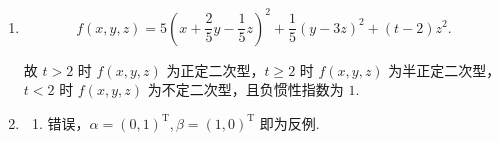 \begin{enumerate}
    设 \(C=\begin{pmatrix}
        C_1 & C_2\\
        C_3 & C_4
        \end{pmatrix},
        D=\begin{pmatrix}
        D_1 & D_2\\
        D_3 & D_4
        \end{pmatrix}\) ,其中 \(C\) 与 \(D\) 的分块均与 \(\begin{pmatrix}E_r & O\\O & O\end{pmatrix}\) 相同. 带入上述等式有 \(\begin{pmatrix}
            C_1 & O\\
            C_3 & O
            \end{pmatrix}=
            \begin{pmatrix}
            D_1 & D_2\\
            O & O
            \end{pmatrix}\)，由此知 \(C_1=D_1,C_3=O,D_2=O\)，故
        \(C=\begin{pmatrix}
        C_1 & C_2\\
        O & C_4
        \end{pmatrix},
        D=\begin{pmatrix}
        C_1 & O\\
        D_3 & D_4
        \end{pmatrix}\).

        由分块三角矩阵的性质知
        \begin{gather*}
            |\lambda E_n-C|=|\lambda E_r-C_1||\lambda E_{n-r}-C_4|,\\
            |\lambda E_n-D|=|\lambda E_r-C_1||\lambda E_{n-r}-D_4|,
        \end{gather*}
        故 \(C,D\) 共同占有 \(C_1\) 的 \(r\) 个特征值，从而 \(C,D\) 至少有 \(r\) 个特征值相同.

    \item
    \[f(x,y,z)=5\left(x+\frac{2}{5}y-\frac15 z\right)^2+\frac15(y-3z)^2+(t-2)z^2. \]

    故 \(t>2\) 时 \(f(x,y,z)\) 为正定二次型，\(t \geqslant 2\) 时 \(f(x,y,z)\) 为半正定二次型，\(t<2\) 时 \(f(x,y,z)\) 为不定二次型，且负惯性指数为 \(1\).

    \item
    \begin{enumerate}
        \item 错误，\(\alpha=(0, 1)^\mathrm{T},\beta=(1, 0)^\mathrm{T}\) 即为反例.


\end{enumerate}
\end{enumerate}
